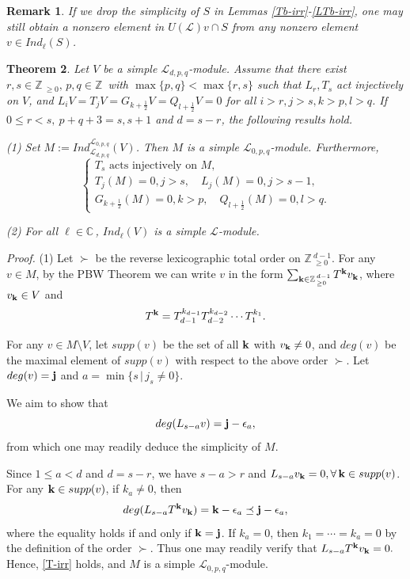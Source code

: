 \documentclass[12pt]{article}
\def\ssc{\scriptscriptstyle}
\def\Z{\mathbb{Z}{\ssc\,}}
\def\C{\mathbb{C}{\ssc\,}}
\numberwithin{equation}{section}
\newtheorem{theo}{Theorem}[section]
\newtheorem{rema}[theo]{Remark}
\begin{document}
\begin{rema}\label{no-irr} If we drop the simplicity of $S$ in Lemmas \ref{Tb-irr}-\ref{LTb-irr}, one  may still obtain a nonzero element in $U(\mathcal{L})v\cap S$ from any nonzero element $v\in Ind_\ell(S)$.
\end{rema}



\begin{theo}\label{T-th} Let $V$ be a simple $\mathcal{L}_{d,p,q}$-module. Assume that there exist $r,s\in\Z_{\ge 0},\, p,q\in\Z$ with $\max\{p,q\}<\max\{r,s\}$ such that $L_r,T_s$ act injectively on $V$, and $L_iV=T_jV=G_{k+\frac{1}{2}}V=Q_{l+\frac{1}{2}}V=0$ for all $i>r,j>s,k>p,l>q$.
If $0\le r<s,\ p+q+3=s,s+1$ and $d=s-r$,  the following results hold.

{\rm (1)}  Set $M:=Ind^{\mathcal{L}_{0,p,q}}_{\mathcal{L}_{d,p,q}}(V)$.  Then $M$ is a simple $\mathcal{L}_{0,p,q}$-module. Furthermore,
\begin{equation}\label{M}\left\{\begin{array}{l} T_s \mbox{ acts injectively on } M,\\
T_j(M)=0,j>s, \quad  L_j(M)=0,j>s-1,\\
 G_{k+\frac{1}{2}}(M)=0,k>p,\quad  Q_{l+\frac{1}{2}}(M)=0, l> q.\end{array}\right.
\end{equation}

{\rm (2)}  For all $\ell\in\C$, $Ind_\ell(V)$ is a simple $\mathcal{L}$-module.
\end{theo}
{\it Proof.}
(1) Let $\succ$ be the reverse lexicographic total order on $\Z_{\ge 0}^{d-1}$. For any $v\in M$, by the PBW Theorem we can write $v$ in the form
$\sum_{{\bf k}\in\Z_{\ge 0}^{d-1}}T^{\bf k}v_{\bf k}$, where $v_{\bf k}\in V$ and
$$T^{\bf k}=T^{k_{d-1}}_{d-1}T^{k_{d-2}}_{d-2}\cdots T^{k_{1}}_{1}.$$

 For any $v\in M\setminus V$, let $supp(v)$ be the set of all $\bf k$ with $v_{\bf k}\ne 0$, and $deg(v)$ be the maximal element of $supp(v)$ with respect to the above   order $\succ$.  Let $deg(v)=\bf j$ and $a=\min\{s\,|\,j_s\ne 0\}$.

We aim to show  that
\begin{equation}\label{T-irr}deg(L_{s-a}v)={\bf j}-\epsilon_a,\end{equation} from which one may readily deduce the simplicity of   $M$.

Since $1\le a<d$ and $d=s-r$, we have $s-a>r$ and $L_{s-a}v_{\bf k}=0, \forall \, {\bf k}\in supp(v)$. For any ${\bf k}\in supp(v)$, if $k_a\ne 0$, then
$$deg(L_{s-a}T^{\bf k}v_{\bf k})={\bf k}-\epsilon_a\preceq {\bf j}-\epsilon_a,$$
where the equality holds if and only if ${\bf k}={\bf j}$. If $k_a=0$, then $k_1=\cdots =k_a=0$ by the definition of the order $\succ$. Thus one may readily verify that $L_{s-a}T^{\bf k}v_{\bf k}=0.$  Hence, \eqref{T-irr} holds, and $M$ is a simple $\mathcal{L}_{0,p,q}$-module.
\end{document}

